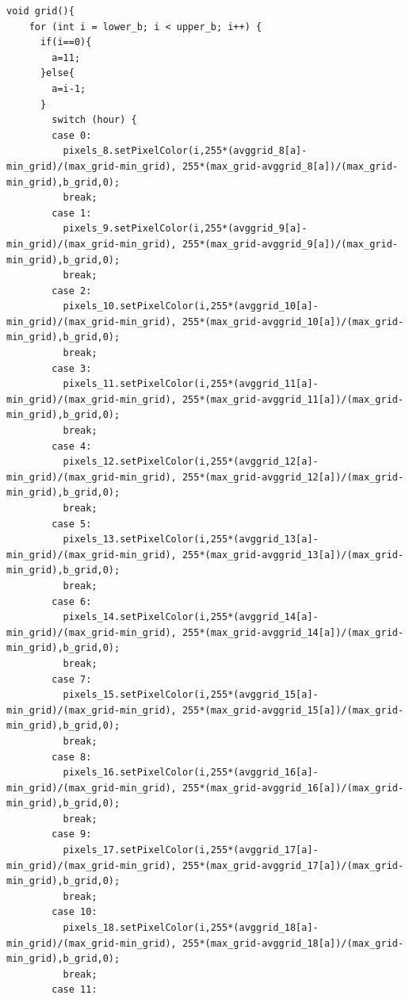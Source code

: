 \documentclass[a4paper,9pt]{article}
\begin{document}
\begin{lstlisting}[basicstyle=\tiny,style=CStyle]
void grid(){
    for (int i = lower_b; i < upper_b; i++) {
      if(i==0){
        a=11;
      }else{
        a=i-1;
      }
        switch (hour) {
        case 0:  
          pixels_8.setPixelColor(i,255*(avggrid_8[a]-min_grid)/(max_grid-min_grid), 255*(max_grid-avggrid_8[a])/(max_grid-min_grid),b_grid,0);
          break;
        case 1:  
          pixels_9.setPixelColor(i,255*(avggrid_9[a]-min_grid)/(max_grid-min_grid), 255*(max_grid-avggrid_9[a])/(max_grid-min_grid),b_grid,0);
          break;
        case 2:  
          pixels_10.setPixelColor(i,255*(avggrid_10[a]-min_grid)/(max_grid-min_grid), 255*(max_grid-avggrid_10[a])/(max_grid-min_grid),b_grid,0);
          break;
        case 3:  
          pixels_11.setPixelColor(i,255*(avggrid_11[a]-min_grid)/(max_grid-min_grid), 255*(max_grid-avggrid_11[a])/(max_grid-min_grid),b_grid,0);
          break;
        case 4:  
          pixels_12.setPixelColor(i,255*(avggrid_12[a]-min_grid)/(max_grid-min_grid), 255*(max_grid-avggrid_12[a])/(max_grid-min_grid),b_grid,0);
          break;
        case 5:  
          pixels_13.setPixelColor(i,255*(avggrid_13[a]-min_grid)/(max_grid-min_grid), 255*(max_grid-avggrid_13[a])/(max_grid-min_grid),b_grid,0);
          break;
        case 6:  
          pixels_14.setPixelColor(i,255*(avggrid_14[a]-min_grid)/(max_grid-min_grid), 255*(max_grid-avggrid_14[a])/(max_grid-min_grid),b_grid,0);
          break;
        case 7:  
          pixels_15.setPixelColor(i,255*(avggrid_15[a]-min_grid)/(max_grid-min_grid), 255*(max_grid-avggrid_15[a])/(max_grid-min_grid),b_grid,0);
          break;
        case 8:  
          pixels_16.setPixelColor(i,255*(avggrid_16[a]-min_grid)/(max_grid-min_grid), 255*(max_grid-avggrid_16[a])/(max_grid-min_grid),b_grid,0);
          break;
        case 9:  
          pixels_17.setPixelColor(i,255*(avggrid_17[a]-min_grid)/(max_grid-min_grid), 255*(max_grid-avggrid_17[a])/(max_grid-min_grid),b_grid,0);
          break;
        case 10:  
          pixels_18.setPixelColor(i,255*(avggrid_18[a]-min_grid)/(max_grid-min_grid), 255*(max_grid-avggrid_18[a])/(max_grid-min_grid),b_grid,0);
          break;
        case 11:
          

\end{lstlisting}
\end{document}
